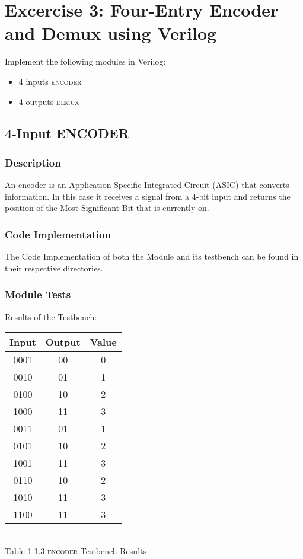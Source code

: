 \section{\color{olive}Excercise 3: Four-Entry Encoder and Demux using Verilog}
Implement the following modules in Verilog:
\begin {itemize}
\item 4 inputs \textsc{encoder}
\item 4 outputs \textsc{demux}
\end {itemize}

\subsection{\color{purple}4-Input ENCODER}
\subsubsection{\color{orange}Description}
An encoder is an Application-Specific Integrated Circuit (ASIC) that converts information. In this case it receives a signal from  a 4-bit input and returns the position of the Most Significant Bit that is currently on.
\subsubsection{\color{orange}Code Implementation}
The Code Implementation of both the Module and its testbench can be found in their respective directories.
\subsubsection{\color{orange}Module Tests}
Results of the Testbench:
\begin{center}
\begin{tabular}{|c|c|c|}
\hline
Input&Output&Value\\
\hline
0001&00&0\\
0010&01&1\\
0100&10&2\\
1000&11&3\\
0011&01&1\\
0101&10&2\\
1001&11&3\\
0110&10&2\\
1010&11&3\\
1100&11&3\\
\hline
\end{tabular}
\\\vspace{12pt}
Table 1.1.3 \textsc{encoder} Testbench Results
\end{center}


